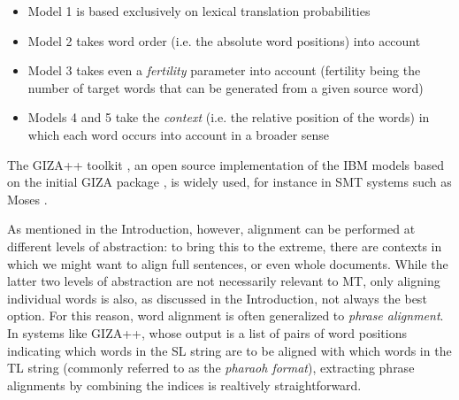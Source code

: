 \begin{itemize}
    \item Model 1 is based exclusively on lexical translation probabilities
    \item Model 2 takes word order (i.e. the absolute word positions) into account 
    \item Model 3 takes even a \textit{fertility} parameter into account (fertility being the number of target words that can be generated from a given source word)
    \item Models 4 and 5 take the \textit{context} (i.e. the relative position of the words) in which each word occurs into account in a broader sense
\end{itemize}

The GIZA++ toolkit \cite{gizapp}, an open source implementation of the IBM models based on the initial GIZA package \cite{giza}, is widely used, for instance in SMT systems such as Moses \cite{moses}. \smallskip

As mentioned in the Introduction, however, alignment can be performed at different levels of abstraction: to bring this to the extreme, there are contexts in which we might want to align full sentences, or even whole documents. While the latter two levels of abstraction are not necessarily relevant to MT, only aligning individual words is also, as discussed in the Introduction, not always the best option. For this reason, word alignment is often generalized to \textit{phrase alignment}. In systems like GIZA++, whose output is a list of pairs of word positions indicating which words in the SL string are to be aligned with which words in the TL string (commonly referred to as the \textit{pharaoh format}), extracting phrase alignments by combining the indices is realtively straightforward. \smallskip 

